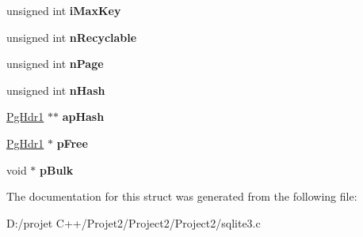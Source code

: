 \begin{DoxyCompactItemize}
unsigned int {\bfseries i\+Max\+Key}
\item 
\mbox{\label{struct_p_cache1_a3501394bd251f08d1f9d26d3b2d4c67c}} 
unsigned int {\bfseries n\+Recyclable}
\item 
\mbox{\label{struct_p_cache1_ace332c276e28352992529f60f0ac457c}} 
unsigned int {\bfseries n\+Page}
\item 
\mbox{\label{struct_p_cache1_a09d9488a8a3a52822e33dd43e14c69e1}} 
unsigned int {\bfseries n\+Hash}
\item 
\mbox{\label{struct_p_cache1_a1169ec7ba2a628d89841d16ced651e1f}} 
\mbox{\hyperlink{struct_pg_hdr1}{Pg\+Hdr1}} $\ast$$\ast$ {\bfseries ap\+Hash}
\item 
\mbox{\label{struct_p_cache1_a91dcc2d2771fa17cf065a1f9ff427d5f}} 
\mbox{\hyperlink{struct_pg_hdr1}{Pg\+Hdr1}} $\ast$ {\bfseries p\+Free}
\item 
\mbox{\label{struct_p_cache1_a32591cc3f60587a1422627a080109fb7}} 
void $\ast$ {\bfseries p\+Bulk}
\end{DoxyCompactItemize}


The documentation for this struct was generated from the following file\+:\begin{DoxyCompactItemize}
\item 
D\+:/projet C++/\+Projet2/\+Project2/\+Project2/sqlite3.\+c\end{DoxyCompactItemize}
